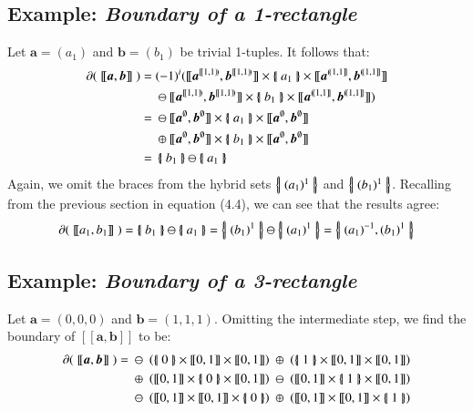 \subsection{Example: \emph{Boundary of a 1-rectangle}}

Let $\boldsymbol{a}= (a_1)$ and $\boldsymbol{b} = (b_1)$ be trivial 1-tuples. 
It follows that:
\begin{align*}
	\partial ( \; [\![ \boldsymbol{a}, \boldsymbol{b} ]\!] \; )
	=& \; (-1)^i ( [\![\boldsymbol{a}^{[\![1,1)\!)}, \boldsymbol{b}^{[\![1,1)\!)} ]\!]
	\times \hset{a_1} \times
	[\![\boldsymbol{a}^{(\!(1,1]\!]}, \boldsymbol{b}^{(\!(1,1]\!]} ]\!]\\
	&\; \ominus
	[\![\boldsymbol{a}^{[\![1,1)\!)}, \boldsymbol{b}^{[\![1,1)\!)} ]\!]
	\times \hset{b_1} \times
	[\![\boldsymbol{a}^{(\!(1,1]\!]}, \boldsymbol{b}^{(\!(1,1]\!]} ]\!] )\\
	=& \; \ominus [\![\boldsymbol{a}^{\emptyset}, \boldsymbol{b}^{\emptyset} ]\!]
	\times \hset{a_1} \times
	[\![\boldsymbol{a}^{\emptyset}, \boldsymbol{b}^{\emptyset} ]\!]\\
	& \; \oplus
	[\![\boldsymbol{a}^{\emptyset}, \boldsymbol{b}^{\emptyset} ]\!]
	\times \hset{b_1} \times
	[\![\boldsymbol{a}^{\emptyset}, \boldsymbol{b}^{\emptyset} ]\!] \\
	=& \; \hset{b_1} \ominus \hset{a_1}
\end{align*}
Again, we omit the braces from the hybrid sets $\left\{ \! \left| \; (a_1)^1 \; \right| \! \right\}$ and $\left\{ \! \left| \; (b_1)^1 \; \right| \! \right\}$.
Recalling from the previous section in equation (4.4), we can see that the results agree:
\begin{equation}
	\partial ( \; [\![ a_1 ,b_1 ]\!] \; ) = \hset{b_1} \ominus \hset{a_1} = \hset{(b_1)^1} \ominus \hset{(a_1)^1} = \hset{(a_1)^{-1}, (b_1)^1}
\end{equation}

\subsection{Example: \emph{Boundary of a 3-rectangle}}
Let $\boldsymbol{a} = (0,0,0)$ and $\boldsymbol{b} = (1,1,1)$.
Omitting the intermediate step, we find the boundary of $[\![ \boldsymbol{a}, \boldsymbol{b} ]\!]$ to be:
\begin{align*}
	\partial ( \; [\![ \boldsymbol{a} , \boldsymbol{b} ]\!] \; ) =
	& 	\; \ominus \; \left( \hset{0} \times [\![0,1]\!] \times [\![0,1]\!] \right)
		\; \oplus \; \left( \hset{1} \times [\![0,1]\!] \times [\![0,1]\!] \right)
	\\& 	\; \oplus \; \left( [\![0,1]\!] \times \hset{0} \times [\![0,1]\!] \right)
	 	\; \ominus \; \left( [\![0,1]\!] \times \hset{1} \times [\![0,1]\!] \right)
	\\& 	\; \ominus \; \left( [\![0,1]\!] \times [\![0,1]\!] \times \hset{0} \right)
	  	\; \oplus \; \left( [\![0,1]\!] \times [\![0,1]\!] \times \hset{1} \right)
\end{align*}

